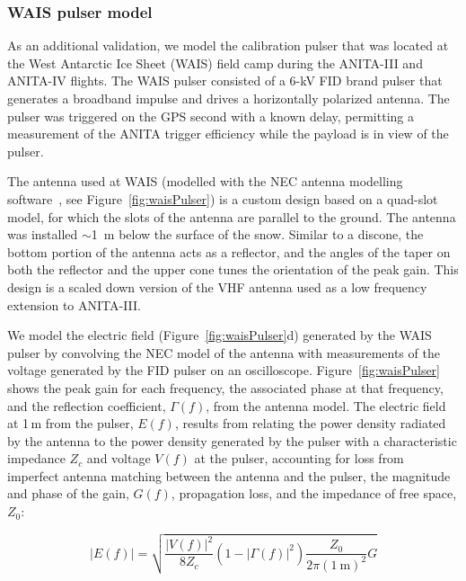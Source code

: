 \subsubsection{WAIS pulser model}
\label{subsec:wais}

As an additional validation, we model the calibration pulser that was located at the West Antarctic Ice Sheet (WAIS) field camp during the ANITA-III and ANITA-IV flights. The WAIS pulser consisted of a 6-kV FID brand pulser that generates a broadband impulse and drives a horizontally polarized antenna. The pulser was triggered on the GPS second with a known delay, permitting a measurement of the  ANITA trigger efficiency while the payload is in view of the pulser.

The antenna used at WAIS (modelled with the NEC antenna modelling software~\cite{nec}, see Figure~\ref{fig:waisPulser}) is a custom design based on a quad-slot model, for which the slots of the antenna are parallel to the ground. The antenna was installed $\sim$1~m below the surface of the snow. Similar to a discone, the bottom portion of the antenna acts as a reflector, and the angles of the taper on both the reflector and the upper cone tunes the orientation of the peak gain. This design is a scaled down version of the VHF antenna used as a low frequency extension to ANITA-III. 

We model the electric field (Figure~\ref{fig:waisPulser}d) generated by the WAIS pulser by convolving the NEC model of the antenna with measurements of the voltage generated by the FID pulser on an oscilloscope.  Figure~\ref{fig:waisPulser} shows the peak gain for each frequency, the associated phase at that frequency, and the reflection coefficient, $\Gamma(f)$, from the antenna model. The electric field at 1\,m from the pulser, $E(f)$, results from relating the power density radiated by the antenna to the power density generated by the pulser with a characteristic impedance $Z_{c}$ and voltage $V(f)$ at the pulser, accounting for loss from imperfect antenna matching between the antenna and the pulser, the magnitude and phase of the gain, $G(f)$, propagation loss, and the impedance of free space, $Z_0$:

\begin{equation}
|E(f)| = \sqrt{\frac{|V(f)|^2}{8 Z_c} (1 -|\Gamma(f)|^2 ) \frac{Z_0}{2\pi (1~\textrm{m})^2} G}
\end{equation}

